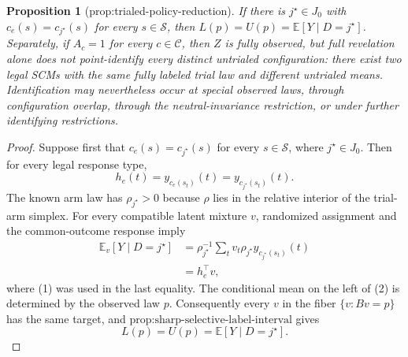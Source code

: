\documentclass{article}
\newtheorem{proposition}{Proposition}
\begin{document}
\begin{proposition}[prop:trialed-policy-reduction]\label{prop:trialed-policy-reduction}
If there is \(j^{\star}\in J_0\) with \(c_e(s)=c_{j^{\star}}(s)\) for every \(s\in\mathcal S\), then \(L(p)=U(p)=\mathbb E[Y\mid D=j^{\star}]\). Separately, if \(A_c=1\) for every \(c\in\mathcal C\), then \(Z\) is fully observed, but full revelation alone does not point-identify every distinct untrialed configuration: there exist two legal SCMs with the same fully labeled trial law and different untrialed means. Identification may nevertheless occur at special observed laws, through configuration overlap, through the neutral-invariance restriction, or under further identifying restrictions.
\end{proposition}
\begin{proof}
Suppose first that \(c_e(s)=c_{j^\star}(s)\) for every \(s\in\mathcal S\), where \(j^\star\in J_0\).  Then for every legal response type,
\[
h_e(t)=y_{c_e(s_t)}(t)=y_{c_{j^\star}(s_t)}(t).
\tag{1}
\]
The known arm law has \(\rho_{j^\star}>0\) because \(\rho\) lies in the relative interior of the trial-arm simplex.  For every compatible latent mixture \(v\), randomized assignment and the common-outcome response imply
\[
\begin{aligned}
\mathbb E_v[Y\mid D=j^\star]
&=\rho_{j^\star}^{-1}
\sum_t v_t\rho_{j^\star}y_{c_{j^\star}(s_t)}(t)\\
&=h_e^{\top}v,
\end{aligned}
\tag{2}
\]
where (1) was used in the last equality.  The conditional mean on the left of (2) is determined by the observed law \(p\).  Consequently every \(v\) in the fiber \(\{v:Bv=p\}\) has the same target, and \(\text{prop:sharp-selective-label-interval}\) gives
\[
L(p)=U(p)=\mathbb E[Y\mid D=j^\star].
\]


\end{proof}
\end{document}
